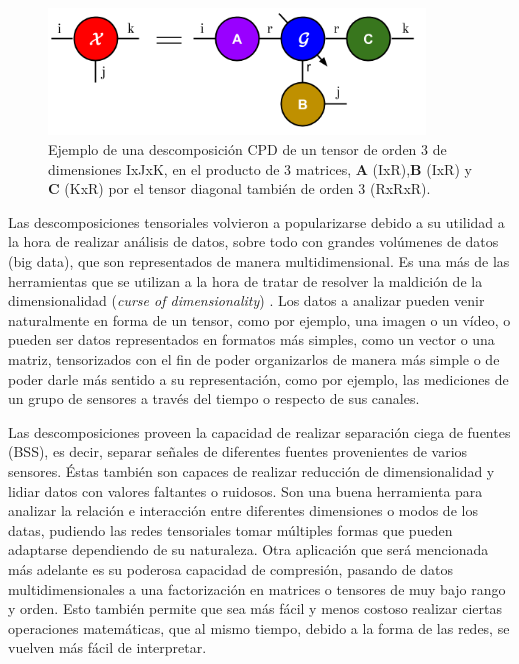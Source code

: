 \documentclass[spanish]{article}
\theoremstyle{definition}
\theoremstyle{remark}
\numberwithin{equation}{section}
\numberwithin{equation}{section} %
\begin{document}
\begin{figure}[ht]
 \centering
 \includegraphics[width=10cm]{img/descomposicion_canonica.png}
\caption[Ejemplo descomposición CPD]{\footnotesize{Ejemplo de una descomposición CPD de un tensor   de orden 3 de dimensiones IxJxK, en el producto de 3 matrices, \textbf{A} (IxR),\textbf{B} (IxR) y \textbf{C} (KxR) por el tensor diagonal  también de orden 3 (RxRxR).
}} 
\label{fig:descomposicion_cpd}
\end{figure}

Las descomposiciones tensoriales volvieron a popularizarse debido a su utilidad a la hora de realizar análisis de datos, sobre todo con grandes volúmenes de datos (big data), que son representados de manera multidimensional. Es una más de las herramientas que se utilizan a la hora de tratar de resolver la maldición de la dimensionalidad (\textit{curse of dimensionality}) \cite{bellman2015adaptive}. Los datos a analizar pueden venir naturalmente en forma de un tensor, como por ejemplo, una imagen o un vídeo, o pueden ser datos representados en formatos más simples, como un vector o una matriz, tensorizados con el fin de poder organizarlos de manera más simple o de poder darle más sentido a su representación, como por ejemplo, las mediciones de un grupo de sensores a través del tiempo o respecto de sus canales. \par
Las descomposiciones proveen la capacidad de realizar separación ciega de fuentes (BSS), es decir, separar señales de diferentes fuentes provenientes de varios sensores. Éstas también son capaces de realizar reducción de dimensionalidad y lidiar datos con valores faltantes o ruidosos. Son una buena herramienta para analizar la relación e interacción entre diferentes dimensiones o modos de los datas, pudiendo las redes tensoriales tomar múltiples formas que pueden adaptarse dependiendo de su naturaleza. Otra aplicación que será mencionada más adelante es su poderosa capacidad de compresión, pasando de datos multidimensionales a una factorización en matrices o tensores de muy bajo rango y orden. Esto también permite que sea más fácil y menos costoso realizar ciertas operaciones matemáticas, que al mismo tiempo, debido a la forma de las redes, se vuelven más fácil de interpretar. \par
\end{document}
